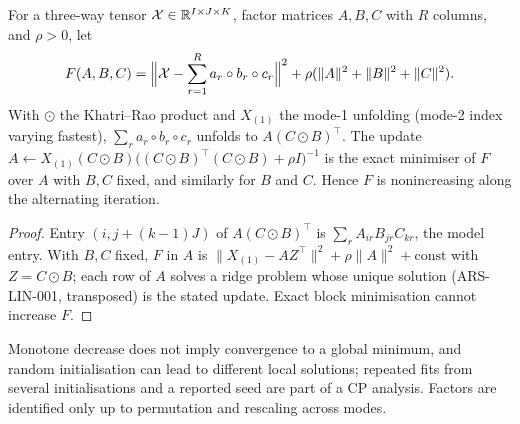 \begin{theorem}\label{ars:cp-001}
For a three-way tensor $\mathcal X\in\mathbb R^{I\times J\times K}$, factor matrices $A,B,C$ with $R$ columns, and $\rho>0$, let
\[F(A,B,C)=\Bigl\|\mathcal X-\sum_{r=1}^R a_r\circ b_r\circ c_r\Bigr\|^2+\rho(\|A\|^2+\|B\|^2+\|C\|^2).\]
With $\odot$ the Khatri--Rao product and $X_{(1)}$ the mode-1 unfolding (mode-2 index varying fastest), $\sum_ra_r\circ b_r\circ c_r$ unfolds to $A(C\odot B)^\top$. The update $A\leftarrow X_{(1)}(C\odot B)\bigl((C\odot B)^\top(C\odot B)+\rho I\bigr)^{-1}$ is the exact minimiser of $F$ over $A$ with $B,C$ fixed, and similarly for $B$ and $C$. Hence $F$ is nonincreasing along the alternating iteration.
\end{theorem}
\begin{proof}
Entry $(i,j+(k-1)J)$ of $A(C\odot B)^\top$ is $\sum_rA_{ir}B_{jr}C_{kr}$, the model entry. With $B,C$ fixed, $F$ in $A$ is $\|X_{(1)}-AZ^\top\|^2+\rho\|A\|^2+\text{const}$ with $Z=C\odot B$; each row of $A$ solves a ridge problem whose unique solution (ARS-LIN-001, transposed) is the stated update. Exact block minimisation cannot increase $F$.
\end{proof}
Monotone decrease does not imply convergence to a global minimum, and random initialisation can lead to different local solutions; repeated fits from several initialisations and a reported seed are part of a CP analysis. Factors are identified only up to permutation and rescaling across modes.

